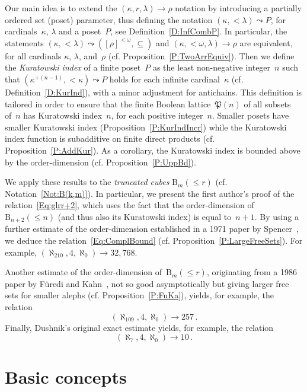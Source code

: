 \documentclass[psamsfonts,reqno]{amsart}
\theoremstyle{plain}
\theoremstyle{definition}
\theoremstyle{remark}
\numberwithin{equation}{section}
\numberwithin{figure}{section}
\newcommand{\gk}{\kappa}
\newcommand{\gl}{\lambda}
\newcommand{\gr}{\rho}
\newcommand{\go}{\omega}
\newcommand{\les}{\leqslant}
\newcommand{\Pow}{\mathfrak{P}}
\newcommand{\rB}{\mathrm{B}}
\begin{document}
Our main idea is to extend the $(\gk,r,\gl)\to\gr$ notation by introducing a partially ordered set (poset) parameter, thus defining the notation $(\gk,{<}\gl)\leadsto P$, for cardinals~$\gk$, $\gl$ and a poset~$P$, see Definition~\ref{D:InfCombP}. In particular, the statements $(\gk,{<}\gl)\leadsto([\gr]^{<\go},\subseteq)$ and $(\gk,{<}\go,\gl)\to\gr$ are equivalent, for all cardinals $\gk$, $\gl$, and~$\gr$ (cf. Proposition~\ref{P:TwoArrEquiv}). Then we define the \emph{Kuratowski index} of a finite poset~$P$ as the least non-negative integer~$n$ such that $(\gk^{+(n-1)},{<}\gk)\leadsto P$ holds for each infinite cardinal~$\gk$ (cf. Definition~\ref{D:KurInd}), with a minor adjustment for antichains. This definition is tailored in order to ensure that the finite Boolean lattice~$\Pow(n)$ of all subsets of~$n$ has Kuratowski index~$n$, for each positive integer~$n$. Smaller posets have smaller Kuratowski index (Proposition~\ref{P:KurIndIncr}) while the Kuratowski index function is subadditive on finite direct products (cf. Proposition~\ref{P:AddKur}). As a corollary, the Kuratowski index is bounded above by the order-dimension (cf. Proposition~\ref{P:UppBd}).

We apply these results to the \emph{truncated cubes} $\rB_m({\les}r)$ (cf. Notation~\ref{Not:B(k,m)}). In particular, we present the first author's proof of the relation~\eqref{Eq:glrr+2}, which uses the fact that the order-dimension of~$\rB_{n+2}({\les}n)$ (and thus also its Kuratowski index) is equal to~$n+1$. By using a further estimate of the order-dimension established in a 1971 paper by Spencer~\cite{Spen71}, we deduce the relation~\eqref{Eq:ComplBound} (cf. Proposition~\ref{P:LargeFreeSets}). For example, $(\aleph_{210},4,\aleph_0)\rightarrow 32{,}768$.

Another estimate of the order-dimension of~$\rB_m({\les}r)$, originating from a 1986 paper by F\"uredi and Kahn~\cite{FuKa86}, not so good asymptotically but giving larger free sets for smaller alephs (cf. Proposition~\ref{P:FuKa}), yields, for example, the relation
 \[
 (\aleph_{109},4,\aleph_0)\rightarrow 257\,.
 \]
Finally, Dushnik's original exact estimate yields, for example, the relation
 \[
 (\aleph_7,4,\aleph_0)\rightarrow 10\,.
 \]
 
\section{Basic concepts}\label{S:Basic}
\end{document}
